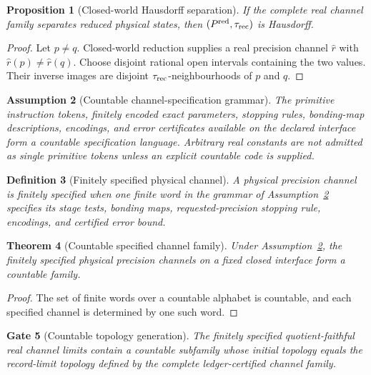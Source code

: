 \documentclass[11pt]{article}
\newtheorem{theorem}{Theorem}[section]
\newtheorem{proposition}[theorem]{Proposition}
\newtheorem{definition}[theorem]{Definition}
\newtheorem{assumption}[theorem]{Assumption}
\newtheorem{gate}[theorem]{Gate}
\theoremstyle{remark}
\begin{document}
\begin{proposition}[Closed-world Hausdorff separation]
\label{prop:closed-world-hausdorff}
If the complete real channel family separates reduced physical states, then
$(P^{\rm red},\tau_{\rm rec})$ is Hausdorff.
\end{proposition}

\begin{proof}
Let $p\neq q$.  Closed-world reduction supplies a real precision channel
$\widehat r$ with $\widehat r(p)\neq\widehat r(q)$.  Choose disjoint rational
open intervals containing the two values.  Their inverse images are disjoint
$\tau_{\rm rec}$-neighbourhoods of $p$ and $q$.
\end{proof}

\begin{assumption}[Countable channel-specification grammar]
\label{ass:countable-channel-grammar}
The primitive instruction tokens, finitely encoded exact parameters, stopping
rules, bonding-map descriptions, encodings, and error certificates available
on the declared interface form a countable specification language.  Arbitrary
real constants are not admitted as single primitive tokens unless an explicit
countable code is supplied.
\end{assumption}

\begin{definition}[Finitely specified physical channel]
\label{def:countable-refinement-protocol}
A physical precision channel is \emph{finitely specified} when one finite word
in the grammar of Assumption~\ref{ass:countable-channel-grammar} specifies its
stage tests, bonding maps, requested-precision stopping rule, encodings, and
certified error bound.
\end{definition}

\begin{theorem}[Countable specified channel family]
\label{thm:countable-channel-family}
Under Assumption~\ref{ass:countable-channel-grammar}, the finitely specified
physical precision channels on a fixed closed interface form a countable family.
\end{theorem}

\begin{proof}
The set of finite words over a countable alphabet is countable, and each
specified channel is determined by one such word.
\end{proof}

\begin{gate}[Countable topology generation]
\label{gate:countable-topology-generation}
The finitely specified quotient-faithful real channel limits contain a
countable subfamily whose initial topology equals the record-limit topology
defined by the complete ledger-certified channel family.
\end{gate}
\end{document}
